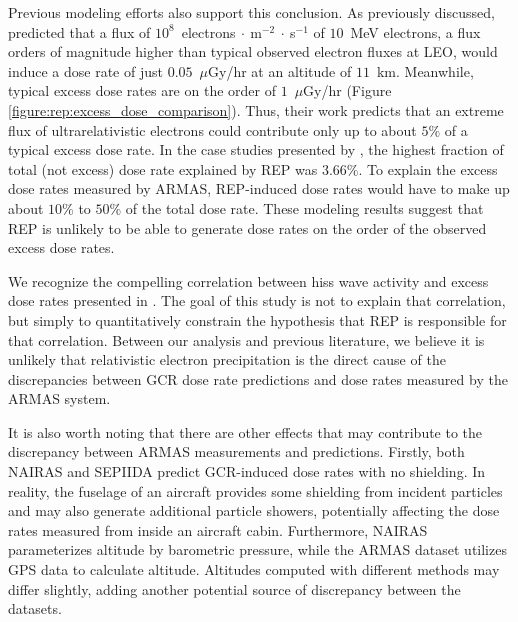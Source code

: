 \documentclass[draft]{agujournal2019}
\newcommand{\ugy}{$\mu$Gy}
\begin{document}
Previous modeling efforts also support this conclusion. As previously discussed,  predicted that a flux of $10^8$~electrons$~\cdot~$m$^{-2}~\cdot~$s$^{-1}$ of $10$~MeV electrons, a flux orders of magnitude higher than typical observed electron fluxes at LEO, would induce a dose rate of just $0.05$~{\ugy}/hr at an altitude of $11$~km. Meanwhile, typical excess dose rates are on the order of $1$~{\ugy}/hr (Figure \ref{figure:rep:excess_dose_comparison}). Thus, their work predicts that an extreme flux of ultrarelativistic electrons could contribute only up to about $5\%$ of a typical excess dose rate. In the case studies presented by , the highest fraction of total (not excess) dose rate explained by REP was $3.66\%$. To explain the excess dose rates measured by ARMAS, REP-induced dose rates would have to make up about $10\%$ to $50\%$ of the total dose rate. These modeling results suggest that REP is unlikely to be able to generate dose rates on the order of the observed excess dose rates.

We recognize the compelling correlation between hiss wave activity and excess dose rates presented in . The goal of this study is not to explain that correlation, but simply to quantitatively constrain the hypothesis that REP is responsible for that correlation. Between our analysis and previous literature, we believe it is unlikely that relativistic electron precipitation is the direct cause of the discrepancies between GCR dose rate predictions and dose rates measured by the ARMAS system.

It is also worth noting that there are other effects that may contribute to the discrepancy between ARMAS measurements and  predictions. Firstly, both NAIRAS and SEPIIDA predict GCR-induced dose rates with no shielding. In reality, the fuselage of an aircraft provides some shielding from incident particles and may also generate additional particle showers, potentially affecting the dose rates measured from inside an aircraft cabin. Furthermore, NAIRAS parameterizes altitude by barometric pressure, while the ARMAS dataset utilizes GPS data to calculate altitude. Altitudes computed with different methods may differ slightly, adding another potential source of discrepancy between the datasets. 
\end{document}
